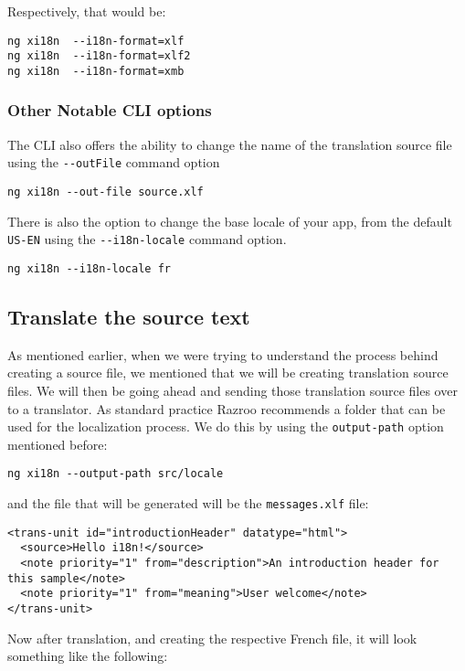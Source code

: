 Respectively, that would be: 
\begin{verbatim}
ng xi18n  --i18n-format=xlf
ng xi18n  --i18n-format=xlf2
ng xi18n  --i18n-format=xmb  
\end{verbatim}

\subsubsection{Other Notable CLI options}
The CLI also offers the ability to change the name of the translation source 
file using the \lstinline{--outFile} command option
\begin{verbatim}
ng xi18n --out-file source.xlf  
\end{verbatim}

There is also the option to change the base locale of your app, from the 
default \lstinline{US-EN} using the \lstinline{--i18n-locale} command option.
\begin{verbatim}
ng xi18n --i18n-locale fr
\end{verbatim}

\subsection{Translate the source text}
As mentioned earlier, when we were trying to understand the process behind creating a source file, we mentioned that we will be creating translation source files. We will then be going ahead and sending those translation source files over to a translator. As standard practice Razroo recommends a folder that can be used for the localization process. We do this by using the \lstinline{output-path} option mentioned before:
\begin{verbatim}
ng xi18n --output-path src/locale  
\end{verbatim}

and the file that will be generated will be the \lstinline{messages.xlf} file:

\begin{lstlisting}[caption=src/locale/messages.xlf]
<trans-unit id="introductionHeader" datatype="html">
  <source>Hello i18n!</source>
  <note priority="1" from="description">An introduction header for this sample</note>
  <note priority="1" from="meaning">User welcome</note>
</trans-unit>
\end{lstlisting}

Now after translation, and creating the respective French file, it will look something like the following: 

